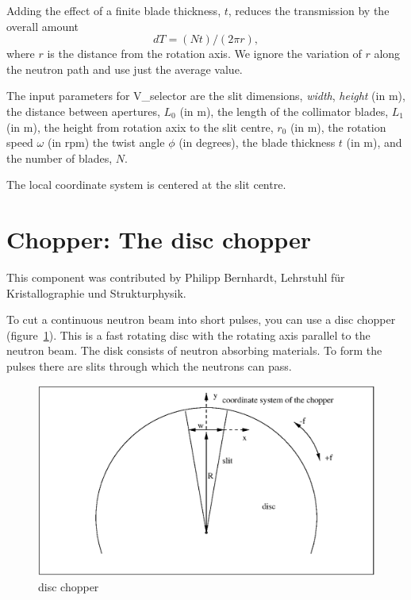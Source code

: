 Adding the effect of a finite blade thickness, $t$, reduces the transmission
by the overall amount
\begin{equation}
dT = (N t) / (2\pi r ) ,
\end{equation}
where $r$ is the distance from the rotation axis. We ignore the variation
of $r$ along the neutron path and use just the average value.

The input parameters for V\_selector are the slit dimensions,
\textit{width}, \textit{height} (in m),
the distance between apertures, $L_0$ (in m), the length of the 
collimator blades, $L_1$ (in m), the height from rotation axix to the slit
centre, $r_0$ (in m), the rotation speed $\omega$ (in rpm)
the twist angle $\phi$ (in degrees), the blade thickness $t$ (in m),
and the number of blades, $N$.

The local coordinate system is centered at the slit centre.

\section{Chopper: The disc chopper}
\label{s:chopper}

This component was contributed by Philipp Bernhardt, Lehrstuhl f\"ur
Kristallographie und Strukturphysik.

To cut a continuous neutron beam into short pulses, you can use a disc
chopper (figure~\ref{f:chopper1}). This is a fast rotating disc with the
rotating axis parallel to the neutron beam. The disk consists of neutron
absorbing materials. To form the pulses there are slits through which
the neutrons can pass.

\begin{figure}[ht]
\includegraphics[width=1.0\linewidth]{figures/Chopper.eps}
\caption{disc chopper\label{f:chopper1}}
\end{figure}

